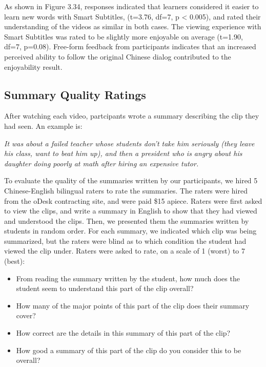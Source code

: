 \documentclass{sigchi}
\begin{document}
As shown in Figure 3.34, responses indicated that learners considered it easier to learn new words with Smart Subtitles, (t=3.76, df=7, p < 0.005), and rated their understanding of the videos as similar in both cases. The viewing experience with Smart Subtitles was rated to be slightly more enjoyable on average (t=1.90, df=7, p=0.08). Free-form feedback from participants indicates that an increased perceived ability to follow the original Chinese dialog contributed to the enjoyability result.

\subsection{Summary Quality Ratings}

After watching each video, partcipants wrote a summary describing the clip they had seen. An example is:

\emph{It was about a failed teacher whose students don't take him seriously (they leave his class, want to beat him up), and then a president who is angry about his daughter doing poorly at math after hiring an expensive tutor.}

To evaluate the quality of the summaries written by our participants, we hired 5 Chinese-English bilingual raters to rate the summaries. The raters were hired from the oDesk contracting site, and were paid \$15 apiece. Raters were
first asked to view the clips, and write a summary in English to show that they had viewed and understood the clips.
Then, we presented them the summaries
written by students in random order. For each summary, we indicated which clip was being summarized, but the raters were blind as to which condition the student had viewed the clip under. Raters were asked to rate, on a scale of 1 (worst) to 7 (best):

\begin{itemize}[noitemsep]
\item From reading the summary written by the student, how much does the student seem to understand this part of the clip overall? %
\item How many of the major points of this part of the clip does their summary cover? %
\item How correct are the details in this summary of this part of the clip? %
\item How good a summary of this part of the clip do you consider this to be overall? %
\end{itemize}
\end{document}
